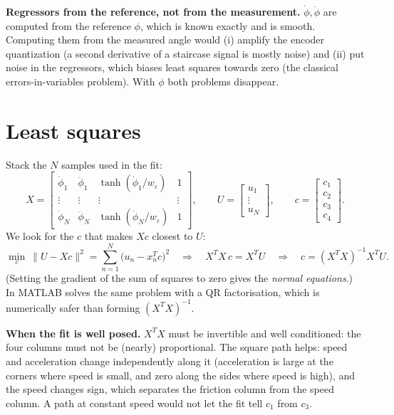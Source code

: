 \documentclass[10pt,a4paper]{article}
\newcommand{\code}[1]{\texttt{\detokenize{#1}}}
\begin{document}
\begin{notebox}
\textbf{Regressors from the reference, not from the measurement.} $\dot\phi,\ddot\phi$ are computed from the reference $\phi$,
which is known exactly and is smooth. Computing them from the measured angle would (i) amplify the encoder quantization
(a second derivative of a staircase signal is mostly noise) and (ii) put noise in the regressors, which biases least squares
towards zero (the classical errors-in-variables problem). With $\phi$ both problems disappear.
\end{notebox}

\section{Least squares}

Stack the $N$ samples used in the fit:
\begin{equation}
  X=\begin{bmatrix}
  \dot\phi_1 & \ddot\phi_1 & \tanh(\dot\phi_1/w_\varepsilon) & 1\\
  \vdots & \vdots & \vdots & \vdots\\
  \dot\phi_N & \ddot\phi_N & \tanh(\dot\phi_N/w_\varepsilon) & 1
  \end{bmatrix},\qquad
  U=\begin{bmatrix}u_1\\ \vdots\\ u_N\end{bmatrix},\qquad
  c=\begin{bmatrix}c_1\\ c_2\\ c_3\\ c_4\end{bmatrix}.
\end{equation}
We look for the $c$ that makes $Xc$ closest to $U$:
\begin{equation}
  \min_c\ \|U-Xc\|^2=\sum_{n=1}^{N}\bigl(u_n-x_n^Tc\bigr)^2
  \quad\Longrightarrow\quad X^TX\,c=X^TU
  \quad\Longrightarrow\quad c=(X^TX)^{-1}X^TU .
\end{equation}
(Setting the gradient of the sum of squares to zero gives the \emph{normal equations}.) In MATLAB \code{c = X \ U} solves the
same problem with a QR factorisation, which is numerically safer than forming $(X^TX)^{-1}$.

\textbf{When the fit is well posed.} $X^TX$ must be invertible and well conditioned: the four columns must not be (nearly)
proportional. The square path helps: speed and acceleration change independently along it (acceleration is large at the
corners where speed is small, and zero along the sides where speed is high), and the speed changes sign, which separates
the friction column from the speed column. A path at constant speed would not let the fit tell $c_1$ from $c_3$.
\end{document}
